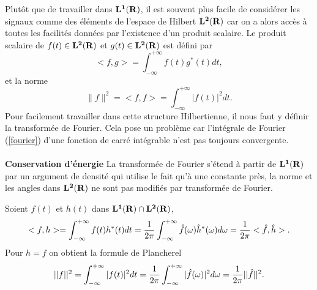 Plut\^ot que de travailler dans ${\bf L ^ 1 ({\bf{R}})}$, il est souvent plus facile
de consid\'erer les signaux comme des \'el\'ements de 
l'espace de Hilbert ${\bf L ^ 2 ({\bf{R}})}$ car on a alors acc\`es \`a toutes les
facilit\'es donn\'ees par l'existence d'un produit scalaire.
Le produit scalaire de $f(t) \in {\bf L ^ 2 ({\bf{R}})}$ et $g(t) \in {\bf L ^ 2 ({\bf{R}})}$
est d\'efini par
\[
<f,g> = \int_{- \infty}^ {+ \infty} f(t)  g^* (t) dt  ,
\]
et la norme
\[
\|f\|^2 = <f,f> = \int_{- \infty}^ {+ \infty} |f(t)|^2 dt  .
\]
Pour facilement travailler dans cette structure Hilbertienne,
il nous faut y d\'efinir la transform\'ee de Fourier.
Cela pose un probl\`eme car l'int\'egrale
de Fourier (\ref{fourier}) d'une fonction de carr\'e int\'egrable n'est pas
toujours convergente. 
\\
\\
{\bf Conservation d'\'energie}
La transform\'ee de Fourier s'\'etend
\`a partir de ${\bf L ^ 1 ({\bf{R}})}$ par un argument de densit\'e qui utilise
le fait qu'\`a une constante pr\`es,
la norme et les angles dans ${\bf L ^ 2 ({\bf{R}})}$ ne
sont pas modifi\'es par transform\'ee de Fourier.

\begin{theorem}
Soient $f(t)$ et $h(t)$ dans ${\bf L ^ 1 ({\bf{R}})} \cap {\bf L ^ 2 ({\bf{R}})}$,
\begin{equation}
\label{parseval}
<f,h> = \int_{- \infty}^ {+ \infty} f(t) h^* (t) dt = 
\frac 1 {2 \pi} 
\int_{- \infty}^{+ \infty} \hat f( {\omega} ) \hat h ^*({\omega}) d{\omega} = 
\frac 1 {2 \pi} < \hat f , \hat h >.
\end{equation}
Pour $h=f$ on obtient la formule de Plancherel
\begin{equation}
\label{plancherel}
|| f ||^2 = 
\int_{- \infty}^ {+ \infty} |f(t)|^2 dt = 
\frac 1 {2 \pi} 
\int_{- \infty}^{+ \infty} |\hat f( {\omega} )|^2 d{\omega} = 
\frac 1 {2 \pi} || \hat f ||^2 .
\end{equation}
\end{theorem}

